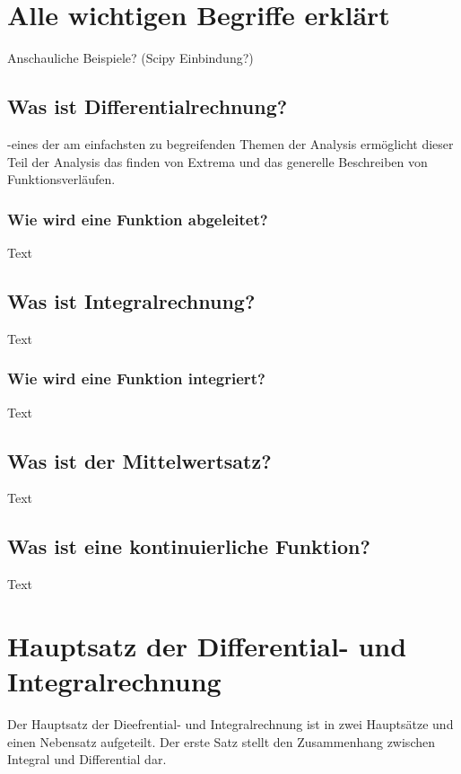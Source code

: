 \documentclass[fontsize=12pt,paper=a4,DIV12,cleardoublepage=empty, 
liststotoc,idxtotoc,bibtotoc]{article}
\theoremstyle{plain}
\theoremstyle{definition}
\begin{document}
	\section{Alle wichtigen Begriffe erklärt}
	Anschauliche Beispiele? (Scipy Einbindung?)
	
	
	\subsection{Was ist Differentialrechnung?}
	-eines der am einfachsten zu begreifenden Themen der Analysis ermöglicht dieser Teil der Analysis das finden von Extrema und das generelle Beschreiben von Funktionsverläufen.
	
	
	\subsubsection{Wie wird eine Funktion abgeleitet?}
		Text
	
	
	\subsection{Was ist Integralrechnung?}
		Text


	\subsubsection{Wie wird eine Funktion integriert?}
		Text
		
	
	\subsection{Was ist der Mittelwertsatz?}
		Text
		
	
	\subsection{Was ist eine kontinuierliche Funktion?}
		Text	
	
	
	
	
	\section{Hauptsatz der Differential- und Integralrechnung}
	
	Der Hauptsatz der Dieefrential- und Integralrechnung ist in zwei Hauptsätze und einen Nebensatz aufgeteilt. Der erste Satz stellt den Zusammenhang zwischen Integral und Differential dar.
\end{document}
